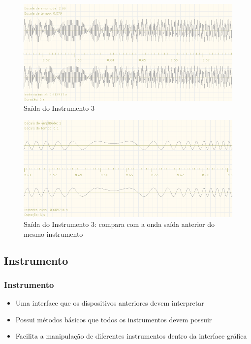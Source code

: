\documentclass{beamer}
\begin{document}
\begin{frame}
 \begin{figure}
  \includegraphics[scale=0.4]{./images/ins3.png}
  \caption{Saída do Instrumento 3}
 \end{figure} 
\end{frame}

\begin{frame}
 \begin{figure}
  \includegraphics[scale=0.4]{./images/ins3_2.png}
  \caption{Saída do Instrumento 3: compara com a onda saída anterior do mesmo instrumento}
 \end{figure} 
\end{frame}

\subsection{Instrumento}
\begin{frame}
 \frametitle{Instrumento}
 \begin{itemize}
 \item Uma interface que os dispositivos anteriores devem interpretar
 \item Possui métodos básicos que todos os instrumentos devem possuir
 \item Facilita a manipulação de diferentes instrumentos dentro da interface gráfica
 \end{itemize}
\end{frame}
\end{document}
